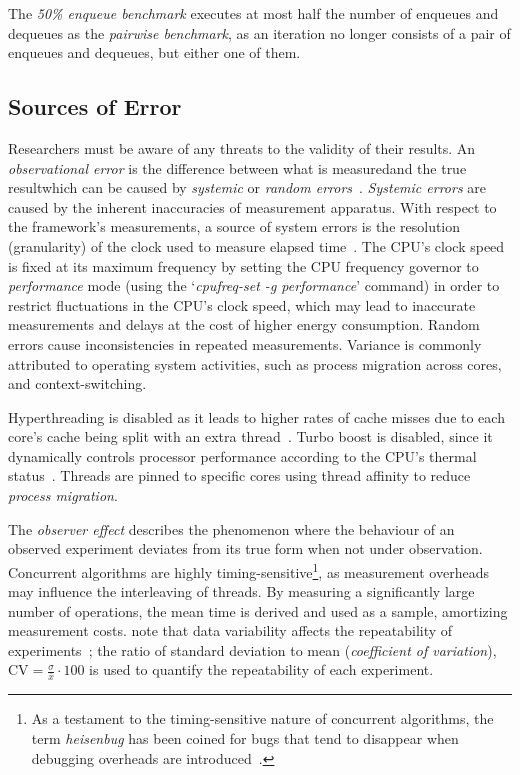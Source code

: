 The \emph{50\% enqueue benchmark} executes at most
half the number of enqueues and dequeues as the \emph{pairwise
benchmark}, as an iteration no longer consists of a pair of
enqueues and dequeues, but either one of them.

\subsection{Sources of Error}
Researchers must be aware of any threats to the validity of
their results. 
An \emph{observational error} is the difference between what is
measured\textemdash and the true result\textemdash which can be caused by
\emph{systemic} or \emph{random errors}~\citep{lelbach2015cppbenchmarking}.
\emph{Systemic errors} are caused by the inherent inaccuracies of measurement
apparatus. 
With respect to the framework's measurements, a source of system errors is the
resolution (granularity) of the clock used to measure elapsed
time~\citep{lelbach2015cppbenchmarking}. 
The CPU's clock speed is fixed at its maximum frequency by setting the CPU
frequency governor to \emph{performance} mode (using the `\emph{cpufreq-set -g
performance}' command) in order to restrict fluctuations in the CPU's clock
speed, which may lead to inaccurate measurements and delays at the cost of
higher energy consumption. Random errors cause inconsistencies in repeated
measurements.
Variance is commonly attributed to operating system activities, such as process
migration across cores, and context-switching.

Hyperthreading is disabled as it leads to higher rates of cache misses due to
each core's cache being split with an extra
thread~\citep{fog2020optimizing}.
Turbo boost is disabled, since it dynamically controls processor performance
according to the CPU's thermal status~\citep[Section~14.3.3]{intel2021system}.
Threads are pinned to specific cores using thread affinity to reduce \emph{process
migration}.

The \emph{observer effect} describes the phenomenon where the behaviour of an
observed experiment deviates
from its true form when not under observation. Concurrent algorithms are
highly timing-sensitive\footnote{As a testament to the timing-sensitive nature
of concurrent algorithms, the term \emph{heisenbug} has been coined for bugs
that tend to disappear when debugging overheads are
introduced~\cite{perfbook2021}.}, as measurement overheads may influence the
interleaving of threads. By measuring a significantly large
number of operations, the mean time is derived and used as a sample, amortizing
measurement costs. \citeauthor{aceto2021benchmarking} note that
data variability affects the repeatability of experiments~\citep{aceto2021benchmarking}; the ratio of standard deviation to
mean (\emph{coefficient of variation}), $\text{CV} = \frac{\sigma}{\bar{x}}
\cdot 100$ is used to quantify the repeatability of each experiment.

